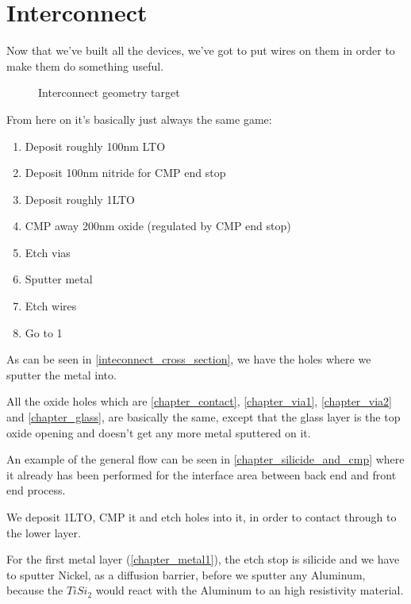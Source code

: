 \section{Interconnect}

Now that we've built all the devices, we've got to put wires on them in order to make them do something useful.

\begin{figure}[H]
	\centering
	\begin{tikzpicture}[node distance = 3cm, auto, thick,scale=\CrossAndTopSectionBig, every node/.style={transform shape}]
		
	\end{tikzpicture}
	\caption{Interconnect geometry target}
	\label{inteconnect_cross_section}
\end{figure}

From here on it's basically just always the same game:
\begin{enumerate}
	\item Deposit roughly 100nm LTO
	\item Deposit 100nm nitride for CMP end stop
	\item Deposit roughly 1\um LTO
	\item CMP away 200nm oxide (regulated by CMP end stop)
	\item Etch vias
	\item Sputter metal
	\item Etch wires
	\item Go to 1
\end{enumerate}

As can be seen in \autoref{inteconnect_cross_section}, we have the holes where we sputter the metal into.

All the oxide holes which are \autoref{chapter_contact}, \autoref{chapter_via1}, \autoref{chapter_via2} and \autoref{chapter_glass}, are basically the same,
except that the glass layer is the top oxide opening and doesn't get any more metal sputtered on it.

An example of the general flow can be seen in \autoref{chapter_silicide_and_cmp} where it already has been performed for the interface area between back end and front end process.

We deposit 1\um LTO, CMP it and etch holes into it, in order to contact through to the lower layer.

For the first metal layer (\autoref{chapter_metal1}), the etch stop is silicide and we have to sputter Nickel, as a diffusion barrier, before we sputter any Aluminum,
because the $Ti Si_2$ would react with the Aluminum to an high resistivity material.

